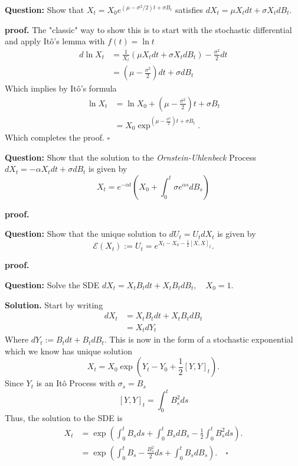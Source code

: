 \documentclass{article}
\begin{document}
\begin{tcolorbox}[colframe=black,colback=gray!5,boxrule=0.5pt]
\textbf{Question:} Show that $X_t = X_0 e^{(\mu-\sigma^2/2)t + \sigma B_t}$ satisfies $dX_t =\mu X_t dt + \sigma X_t dB_t$.
\end{tcolorbox}
\textbf{proof.} The "classic" way to show this is to start with the stochastic differential and apply Itô's lemma with $f(t) = \ln t$
\begin{align*}
    d\ln X_t  &= \frac{1}{X_t}(\mu X_t dt + \sigma X_t dB_t) - \frac{\sigma^2}{2}dt \\
              &= \left(\mu - \frac{\sigma^2}{2}\right)dt + \sigma dB_t
\end{align*}
Which implies by Itô's formula
\begin{align*}
    \ln X_t &= \ln X_0 + \left(\mu - \frac{\sigma^2}{2}\right)t + \sigma B_t \\
    &= X_0 \exp^{\left(\mu - \frac{\sigma^2}{2}\right)t + \sigma B_t}.
\end{align*}
Which completes the proof. $\square$

\begin{tcolorbox}[colframe=black,colback=gray!5,boxrule=0.5pt]
\textbf{Question:} Show that the solution to the \textit{Ornstein-Uhlenbeck} Process $dX_t = -\alpha X_tdt + \sigma dB_t$ is given by 
$$X_t = e^{-\alpha t}\left(X_0 + \int_0^t\sigma e^{\alpha s}dB_s\right)$$
\end{tcolorbox}
\textbf{proof.}

\begin{tcolorbox}[colframe=black,colback=gray!5,boxrule=0.5pt]
\textbf{Question:} Show that the unique solution to $dU_t = U_tdX_t$ is given by 
$$\mathcal{E}(X_t) := U_t = e^{X_t - X_0 - \frac{1}{2}[X,X]_t}.$$
\end{tcolorbox}
\textbf{proof.}

\begin{tcolorbox}[colframe=black,colback=gray!5,boxrule=0.5pt]
\textbf{Question:} Solve the SDE $dX_t = X_tB_tdt + X_tB_tdB_t, \quad X_0=1$.
\end{tcolorbox}
\textbf{Solution.} Start by writing
\begin{align*}
    dX_t &= X_tB_tdt + X_tB_tdB_t \\
    &= X_tdY_t
\end{align*}
Where $dY_t := B_tdt + B_tdB_t$. This is now in the form of a stochastic exponential which we know has unique solution
$$X_t = X_0\exp\left(Y_t - Y_0 + \frac{1}{2}[Y,Y]_t\right).$$
Since $Y_t$ is an Itô Process with $\sigma_s = B_s$
$$[Y,Y]_t = \int_0^t B_s^2 ds$$
Thus, the solution to the SDE is 
\begin{align*}
    X_t &= \exp\left( \int_0^tB_sds + \int_0^t B_sdB_s - \frac{1}{2}\int_0^t B_s^2ds\right). \\
    &= \exp\left( \int_0^tB_s - \frac{B_s^2}{2}ds + \int_0^t B_sdB_s \right). \quad \square
\end{align*}
\end{document}
